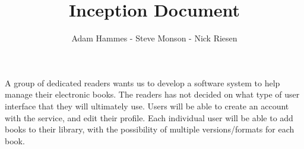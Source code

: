 \documentclass{article}
\title{Inception Document}
\author{Adam Hammes - Steve Monson - Nick Riesen}
\begin{document}
\maketitle

A group of dedicated readers wants us to develop a software system to help manage their electronic books.
The readers has not decided on what type of user interface that they will ultimately use.
Users will be able to create an account with the service, and edit their profile.
Each individual user will be able to add books to their library, with the possibility of multiple versions/formats for each book.
\end{document}
